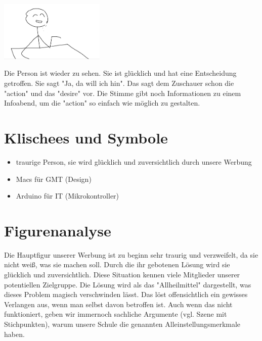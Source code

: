 \documentclass[8pt, letterpaper]{article}
\begin{document}
\includegraphics[width=5cm]{scene_13}

Die Person ist wieder zu sehen. Sie ist glücklich und hat eine Entscheidung getroffen. Sie sagt "Ja, da will ich hin". Das sagt dem Zuschauer schon die "action" und das "desire" vor. Die Stimme gibt noch Informationen zu einem Infoabend, um die "action" so einfach wie möglich zu gestalten.

\section{Klischees und Symbole}
\begin{itemize}
    \item traurige Person, sie wird glücklich und zuversichtlich durch unsere Werbung
    \item Macs für GMT (Design)
    \item Arduino für IT (Mikrokontroller)
\end{itemize}

\section{Figurenanalyse}
Die Hauptfigur unserer Werbung ist zu beginn sehr traurig und verzweifelt, da sie nicht weiß, was sie machen soll. Durch die ihr gebotenen Lösung wird sie glücklich und zuversichtlich. Diese Situation kennen viele Mitglieder unserer potentiellen Zielgruppe. Die Lösung wird als das "Allheilmittel" dargestellt, was dieses Problem magisch verschwinden lässt. Das löst offensichtlich ein gewisses Verlangen aus, wenn man selbst davon betroffen ist. Auch wenn das nicht funktioniert, geben wir immernoch sachliche Argumente (vgl. Szene mit Stichpunkten), warum unsere Schule die genannten Alleinstellungsmerkmale haben.

% 
\end{document}
